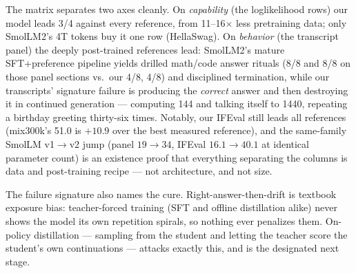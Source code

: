 The matrix separates two axes cleanly. On \emph{capability} (the
loglikelihood rows) our model leads 3/4 against every reference, from
11--16$\times$ less pretraining data; only SmolLM2's 4T tokens buy it
one row (HellaSwag). On \emph{behavior} (the transcript panel) the
deeply post-trained references lead: SmolLM2's mature SFT+preference
pipeline yields drilled math/code answer rituals (8/8 and 8/8 on those
panel sections vs.\ our 4/8, 4/8) and disciplined termination, while our
transcripts' signature failure is producing the \emph{correct} answer
and then destroying it in continued generation --- computing 144 and
talking itself to 1440, repeating a birthday greeting thirty-six times.
Notably, our IFEval still leads all references (mix300k's 51.0 is
$+10.9$ over the best measured reference), and the same-family
SmolLM v1$\to$v2 jump (panel $19 \to 34$, IFEval $16.1 \to 40.1$ at
identical parameter count) is an existence proof that everything
separating the columns is data and post-training recipe --- not
architecture, and not size.

The failure signature also names the cure. Right-answer-then-drift is
textbook exposure bias: teacher-forced training (SFT and offline
distillation alike) never shows the model its own repetition spirals, so
nothing ever penalizes them. On-policy distillation --- sampling from
the student and letting the teacher score the student's own
continuations --- attacks exactly this, and is the designated next stage.

